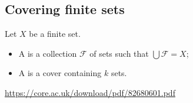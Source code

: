 \subsection{Covering finite sets}
\begin{definition}
Let $X$ be a finite set.
\begin{itemize}
\item A  is a collection $\mathcal{F}$ of sets such that $\bigcup \mathcal{F} = X$;
\item A  is a cover containing $k$ sets.
\end{itemize}
\end{definition}

\url{https://core.ac.uk/download/pdf/82680601.pdf}